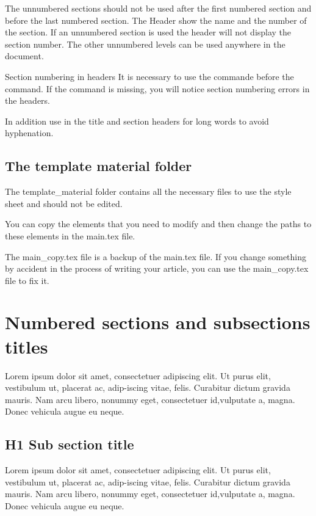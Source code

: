 \documentclass[Theme1]{{template_material/eurostat}}
\begin{document}
The unnumbered sections should not be used after the first numbered section and before the last numbered section. The Header show the name and the number of the section. If an unnumbered section is used the header will not display the section number. The other unnumbered levels can be used anywhere in the document.

\begin{boxe3}{Section numbering in headers}
    It is necessary to use the  commande before the  command. If the  command is missing, you will notice section numbering errors in the headers.
    \par In addition use  in the title and section headers for long words to avoid hyphenation. 
\end{boxe3}

\subsection{The template material folder}

The template\_material folder contains all the necessary files to use the style sheet and should not be edited. 

You can copy the elements that you need to modify and then change the paths to these elements in the main.tex file.

The main\_copy.tex file is a backup of the main.tex file. If you change something by accident in the process of writing your article, you can use the main\_copy.tex file to fix it. 

\newpage %
\section{Numbered sections and \mbox{subsections} titles}
Lorem ipsum dolor sit amet, consectetuer adipiscing elit. Ut purus elit, vestibulum ut, placerat ac, adip-iscing vitae, felis. Curabitur dictum gravida mauris. Nam arcu libero, nonummy eget, consectetuer id,vulputate a, magna. Donec vehicula augue eu neque.
\subsection{H1 Sub section title}
Lorem ipsum dolor sit amet, consectetuer adipiscing elit. Ut purus elit, vestibulum ut, placerat ac, adip-iscing vitae, felis. Curabitur dictum gravida mauris. Nam arcu libero, nonummy eget, consectetuer id,vulputate a, magna. Donec vehicula augue eu neque.
\end{document}
